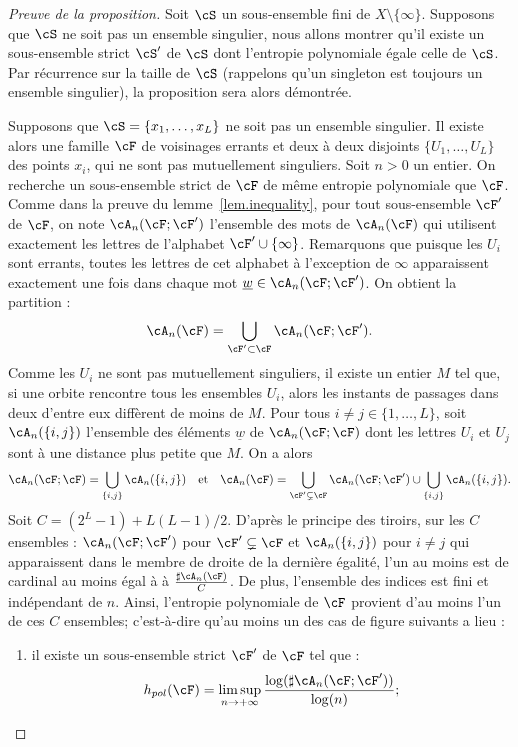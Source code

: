 \begin{proof}[Preuve de la proposition]
Soit $\cS$ un sous-ensemble fini de $X \setminus \{\infty\}$. Supposons que $\cS$ ne soit pas un ensemble singulier, nous allons montrer qu'il existe un sous-ensemble strict $\cS'$ de $\cS$ dont l'entropie polynomiale égale celle de $\cS$. Par récurrence sur la taille de $\cS$ (rappelons qu'un singleton est toujours un ensemble singulier), la proposition sera alors démontrée.

Supposons que $\cS=\{x_1, \dots, x_L\}$ ne soit pas un ensemble singulier. Il existe alors une famille $\cF$ de voisinages errants et deux à deux disjoints $\{U_1, \dots, U_L\}$ des points $x_i$, qui ne sont pas mutuellement singuliers. Soit $n>0$ un entier. On recherche un sous-ensemble strict de $\cF$ de même entropie polynomiale que $\cF$. Comme dans la preuve du lemme~\ref{lem.inequality}, pour tout sous-ensemble $\cF'$ de $\cF$, on note $\cA_n(\cF;\cF')$ l'ensemble des mots de $\cA_n(\cF)$ qui utilisent exactement les lettres de l'alphabet $\cF'\cup\{\infty\}$. Remarquons que puisque les $U_i$ sont errants, toutes les lettres de cet alphabet à l'exception de $\infty$ apparaissent exactement une fois {dans chaque mot $\underline{w} \in \cA_n(\cF;\cF')$}. On obtient la partition :
\[
\cA_n(\cF) = \bigcup_{\cF' \subset \cF} \cA_n(\cF; \cF').
\]
Comme les $U_i$ ne sont pas mutuellement singuliers, il existe un entier $M$ tel que, si une orbite rencontre tous les ensembles $U_i$, alors les instants de passages dans deux d'entre eux diffèrent de moins de $M$. Pour tous $i \neq j \in \{1, \dots, L\}$, soit $\cA_n(\{i,j\})$ l'ensemble des éléments $\underline{w}$ de $\cA_n(\cF;\cF)$ dont les lettres $U_i$ et $U_j$ sont à une distance plus petite que $M$. {On a alors}
\[
\cA_n(\cF;\cF) = \bigcup_{\{i,j\}} \cA_n(\{i,j\}) \ \ \text{ et } \ \
\cA_n(\cF) = \bigcup_{\cF' \subsetneq \cF} \cA_n(\cF; \cF') \cup \bigcup_{\{i,j\}} \cA_n(\{i,j\}).
\]
Soit $C = (2^L-1)+L(L-1)/2$. D'après le principe des tiroirs, sur les $C$ ensembles : $\cA_n(\cF;\cF')$ pour $\cF' \subsetneq \cF$ et $\cA_n(\{i,j\})$ pour $i\neq j$ qui apparaissent dans le membre de droite de la dernière égalité, {l'un au moins} est de cardinal {au moins égal à} à $\frac{\sharp \cA_n(\cF)}{C}$. De plus, l'ensemble des indices est fini et indépendant de $n$. Ainsi, l'entropie polynomiale de $\cF$ provient d'au moins l'un de ces $C$ ensembles; c'est-à-dire qu'au moins un {des cas de figure suivants} a lieu :
\begin{enumerate}
\item \label{item1} il existe un sous-ensemble strict $\cF'$ de $\cF$ tel que :
\begin{equation}\label{eq1}
h_{pol}(\cF)= \limsup_{n \to +\infty} \frac{\log(\sharp\cA_n(\cF;\cF'))}{\log(n)};
\end{equation}


\end{enumerate}
\end{proof}
